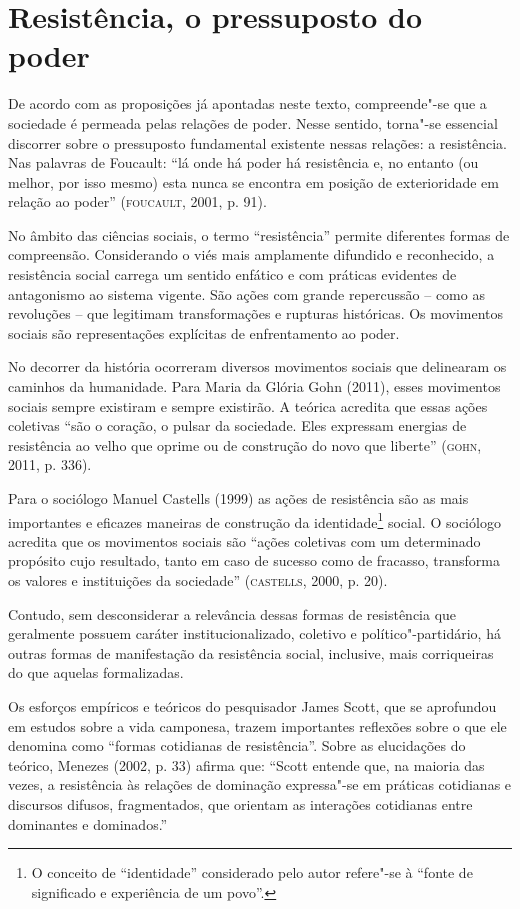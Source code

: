 \section{Resistência, o pressuposto do poder}

\noindent{}De acordo com as proposições já apontadas neste texto, compreende"-se que
a sociedade é permeada pelas relações de poder. Nesse sentido, torna"-se
essencial discorrer sobre o pressuposto fundamental existente nessas
relações: a resistência. Nas palavras de Foucault: ``lá onde há poder há
resistência e, no entanto (ou melhor, por isso mesmo) esta nunca se
encontra em posição de exterioridade em relação ao poder'' (\textsc{foucault},
2001, p. 91).

No âmbito das ciências sociais, o termo ``resistência'' permite
diferentes formas de compreensão. Considerando o viés mais amplamente
difundido e reconhecido, a resistência social carrega um sentido
enfático e com práticas evidentes de antagonismo ao sistema vigente. São
ações com grande repercussão -- como as revoluções -- que legitimam
transformações e rupturas históricas. Os movimentos sociais são
representações explícitas de enfrentamento ao poder.

No decorrer da história ocorreram diversos movimentos sociais que
delinearam os caminhos da humanidade. Para Maria da Glória Gohn (2011),
esses movimentos sociais sempre existiram e sempre existirão. A teórica
acredita que essas ações coletivas ``são o coração, o pulsar da
sociedade. Eles expressam energias de resistência ao velho que oprime ou
de construção do novo que liberte'' (\textsc{gohn}, 2011, p. 336).

Para o sociólogo Manuel Castells (1999) as ações de resistência são as
mais importantes e eficazes maneiras de construção da
identidade\footnote{O conceito de ``identidade'' considerado pelo autor
  refere"-se à ``fonte de significado e experiência de um povo''.} social.
O sociólogo acredita que os movimentos sociais são ``ações coletivas com
um determinado propósito cujo resultado, tanto em caso de sucesso como
de fracasso, transforma os valores e instituições da sociedade''
(\textsc{castells}, 2000, p. 20).

Contudo, sem desconsiderar a relevância dessas formas de resistência que
geralmente possuem caráter institucionalizado, coletivo e
político"-partidário, há outras formas de manifestação da resistência
social, inclusive, mais corriqueiras do que aquelas formalizadas.

Os esforços empíricos e teóricos do pesquisador James Scott, que se
aprofundou em estudos sobre a vida camponesa, trazem importantes
reflexões sobre o que ele denomina como ``formas cotidianas de
resistência''. Sobre as elucidações do teórico, Menezes (2002, p. 33)
afirma que: ``Scott entende que, na maioria das vezes, a resistência às
relações de dominação expressa"-se em práticas cotidianas e discursos
difusos, fragmentados, que orientam as interações cotidianas entre
dominantes e dominados.''

